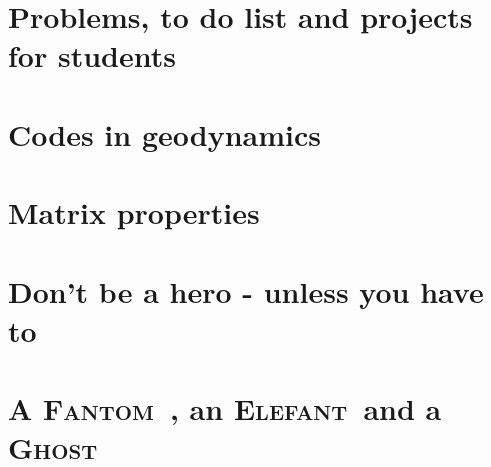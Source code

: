 \documentclass[a4paper]{article}
\newcommand{\elefant}{{\textsc{Elefant~}{}}}
\newcommand{\fantom}{{\textsc{Fantom~}{}}}
\newcommand{\ghost}{{\textsc{Ghost~}{}}}
\numberwithin{equation}{section}
\begin{document}

\newpage %
\section{Problems, to do list and projects for students} %

\appendix %

\newpage %
\section{Codes in geodynamics \label{app:codes} } %
\newpage %
\section{Matrix properties}  %
\newpage %
\section{Don't be a hero - unless you have to}  %
\newpage %
\section{A \fantom, an \elefant and a \ghost}  %
\newpage %
\end{document}
